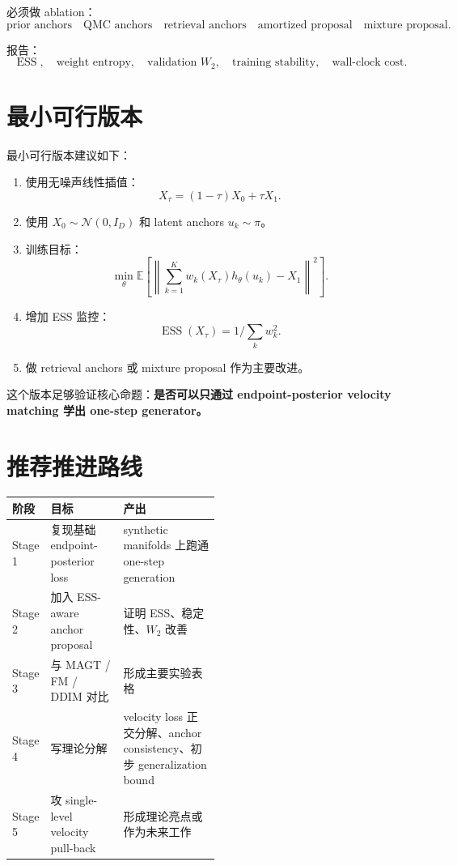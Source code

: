 \documentclass[UTF8,11pt]{ctexart}
\newcommand{\E}{\mathbb{E}}
\newcommand{\cN}{\mathcal{N}}
\newcommand{\ESS}{\operatorname{ESS}}
\begin{document}
必须做 ablation：
\[
\text{prior anchors}
\quad
\text{QMC anchors}
\quad
\text{retrieval anchors}
\quad
\text{amortized proposal}
\quad
\text{mixture proposal}.
\]

报告：
\[
\ESS,\quad
\text{weight entropy},\quad
\text{validation }W_2,\quad
\text{training stability},\quad
\text{wall-clock cost}.
\]

\section{最小可行版本}

最小可行版本建议如下：
\begin{enumerate}
\item 使用无噪声线性插值：
\[
X_\tau=(1-\tau)X_0+\tau X_1.
\]
\item 使用 \(X_0\sim\cN(0,I_D)\) 和 latent anchors \(u_k\sim\pi\)。
\item 训练目标：
\[
\min_\theta
\E
\left[
\left\|
\sum_{k=1}^K w_k(X_\tau)h_\theta(u_k)
-
X_1
\right\|^2
\right].
\]
\item 增加 ESS 监控：
\[
\ESS(X_\tau)=1/\sum_kw_k^2.
\]
\item 做 retrieval anchors 或 mixture proposal 作为主要改进。
\end{enumerate}

这个版本足够验证核心命题：\textbf{是否可以只通过 endpoint-posterior velocity matching 学出 one-step generator。}

\section{推荐推进路线}

\begin{table}[h]
\centering
\small
\begin{tabularx}{\linewidth}{p{0.16\linewidth}p{0.35\linewidth}Y}
\toprule
阶段 & 目标 & 产出 \\
\midrule
Stage 1 & 复现基础 endpoint-posterior loss & synthetic manifolds 上跑通 one-step generation \\
Stage 2 & 加入 ESS-aware anchor proposal & 证明 ESS、稳定性、\(W_2\) 改善 \\
Stage 3 & 与 MAGT / FM / DDIM 对比 & 形成主要实验表格 \\
Stage 4 & 写理论分解 & velocity loss 正交分解、anchor consistency、初步 generalization bound \\
Stage 5 & 攻 single-level velocity pull-back & 形成理论亮点或作为未来工作 \\
\bottomrule
\end{tabularx}
\end{table}
\end{document}
